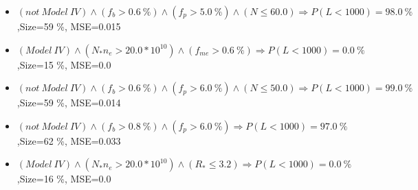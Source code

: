 \documentclass[numbered]{CSL}
\begin{document}
\begin{itemize}
\item $(not~Model~IV) \land (f_b > 0.6~\%) \land (f_p > 5.0~\%) \land (N \leq 60.0) \Rightarrow P(L < 1 000) = 98.0~\%$,\hfill Size=59 \%, MSE=0.015
\item $(Model~IV) \land (N_* n_e > 20.0 * 10^{10}) \land (f_{me} > 0.6~\%) \Rightarrow P(L < 1 000) = 0.0~\%$,\hfill Size=15 \%, MSE=0.0
\item $(not~Model~IV) \land (f_b > 0.6~\%) \land (f_p > 6.0~\%) \land (N \leq 50.0) \Rightarrow P(L < 1 000) = 99.0~\%$,\hfill Size=59 \%, MSE=0.014
\item $(not~Model~IV) \land (f_b > 0.8~\%) \land (f_p > 6.0~\%) \Rightarrow P(L < 1 000) = 97.0~\%$,\hfill Size=62 \%, MSE=0.033
\item $(Model~IV) \land (N_* n_e > 20.0 * 10^{10}) \land (R_* \leq 3.2) \Rightarrow P(L < 1 000) = 0.0~\%$,\hfill Size=16 \%, MSE=0.0
\end{itemize}
\end{document}
